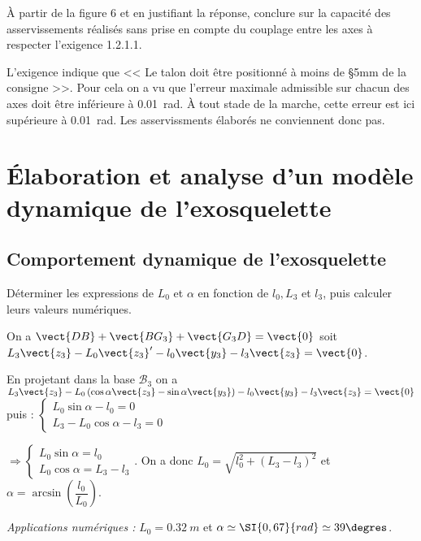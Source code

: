 \documentclass[11pt]{article}
\begin{document}
\UPSTIquestion À partir de la figure 6 et en justifiant la réponse, conclure sur la capacité des asservissements réalisés sans prise en compte du couplage entre les axes à respecter l'exigence 1.2.1.1.

\begin{UPSTIcorrige}
L'exigence indique que << Le talon doit être positionné à moins de
\S{5}{mm} de la consigne >>. Pour cela on a vu que l'erreur maximale admissible sur chacun des axes doit être inférieure à \SI{0,01}{rad}. À tout stade de la marche, cette erreur est ici supérieure à \SI{0,01}{rad}. Les asservissments élaborés ne conviennent donc pas.
\end{UPSTIcorrige}


\section{Élaboration et analyse d'un modèle dynamique de l'exosquelette}


\subsection{Comportement dynamique de l'exosquelette}


\UPSTIquestion Déterminer les expressions de $L_{0}$ et $\alpha$ en fonction de $l_{0}, L_{3}$ et $l_{3}$, puis calculer leurs valeurs numériques.

\begin{UPSTIcorrige}
On a $\vect{DB}+\vect{BG_3}+\vect{G_3D} = \vect{0}$ soit $L_3\vect{z_3}-L_0\vect{z_3}'-l_0\vect{y_3}-l_3\vect{z_3} = \vect{0}$. 

En projetant dans la base $\mathcal{B}_3$ on a 
$L_3\vect{z_3}-L_0\left(\cos\alpha \vect{z_3} - \sin\alpha \vect{y_3} \right)-l_0\vect{y_3}-l_3\vect{z_3} = \vect{0}$ puis : 
$
\left\{ \begin{array}{l}
L_0 \sin\alpha -l_0 = 0 \\
L_3-L_0 \cos\alpha -l_3 = 0
\end{array}
\right.
$

$
\Rightarrow 
\left\{ \begin{array}{l}
L_0 \sin\alpha = l_0  \\
L_0 \cos\alpha  = L_3 - l_3 
\end{array}
\right.
$.
On a donc $L_0 =\sqrt{l_0 ^2 + \left(L_3- l_3\right)^2}$ et $\alpha = \arcsin \left(\dfrac{l_0}{L_0}\right)$.

\textit{Applications numériques : } $L_0= \SI{0,32}{m}$ et $\alpha \simeq \SI{0,67}{rad} \simeq 39\degres$.

\end{UPSTIcorrige}
\end{document}
